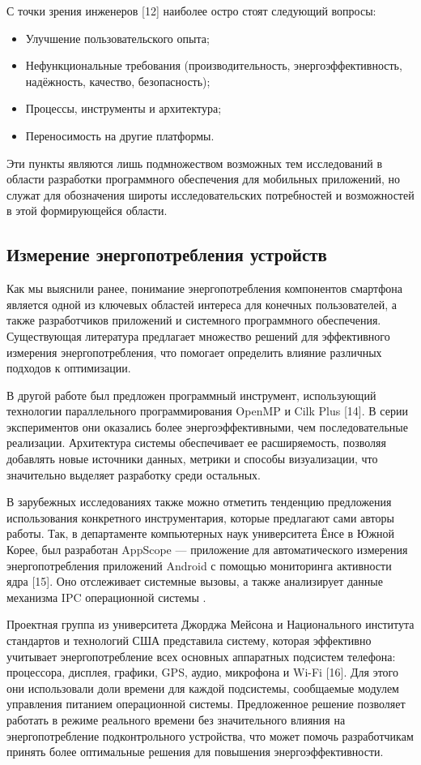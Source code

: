\documentclass[a4paper,14pt]{extarticle} %
\begin{document}
	С точки зрения инженеров [12] наиболее остро стоят следующий вопросы: 
	\begin{itemize}
		\item Улучшение пользовательского опыта; 
		\item Нефункциональные требования (производительность, энергоэффективность, надёжность, качество, безопасность);
		\item Процессы, инструменты и архитектура; 
		\item Переносимость на другие платформы. 
	\end{itemize}

	Эти пункты являются лишь подмножеством возможных тем исследований в области разработки программного обеспечения для мобильных приложений, но служат для обозначения широты исследовательских потребностей и возможностей в этой формирующейся области.
	
	\subsection{Измерение энергопотребления устройств}

	Как мы выяснили ранее, понимание энергопотребления компонентов смартфона является одной из ключевых областей интереса для конечных пользователей, а также разработчиков приложений и системного программного обеспечения. Существующая литература предлагает множество решений для эффективного измерения энергопотребления, что помогает определить влияние различных подходов к оптимизации.
	
	В другой работе был предложен программный инструмент, использующий технологии параллельного программирования OpenMP и Cilk Plus [14]. В серии экспериментов они оказались более энергоэффективными, чем последовательные реализации. Архитектура системы обеспечивает ее расширяемость, позволяя добавлять новые источники данных, метрики и способы визуализации, что значительно выделяет разработку среди остальных.
	
	В зарубежных исследованиях также можно отметить тенденцию предложения использования конкретного инструментария, которые предлагают сами авторы работы. Так, в департаменте компьютерных наук университета Ёнсе в Южной Корее, был разработан AppScope — приложение для автоматического измерения энергопотребления приложений Android с помощью мониторинга активности ядра [15]. Оно отслеживает системные вызовы, а также анализирует данные механизма IPC операционной системы . 
	
	Проектная группа из университета Джорджа Мейсона и Национального института стандартов и технологий США представила систему, которая эффективно учитывает энергопотребление всех основных аппаратных подсистем телефона: процессора, дисплея, графики, GPS, аудио, микрофона и Wi-Fi [16]. Для этого они использовали доли времени для каждой подсистемы, сообщаемые модулем управления питанием операционной системы. Предложенное решение позволяет работать в режиме реального времени без значительного влияния на энергопотребление подконтрольного устройства, что может помочь разработчикам принять более оптимальные решения для повышения энергоэффективности.
\end{document}
